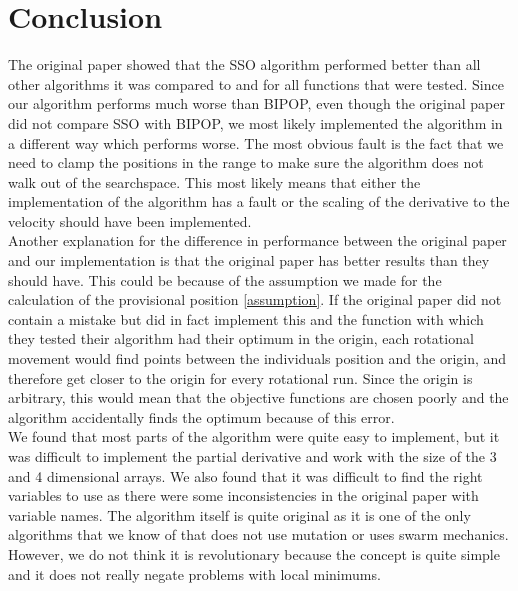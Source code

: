 \documentclass[runningheads]{llncs}
\begin{document}
\section{Conclusion}
The original paper showed that the SSO algorithm performed better than all other algorithms it was compared to and for all functions that were tested. Since our algorithm performs much worse than BIPOP, even though the original paper did not compare SSO with BIPOP, we most likely implemented the algorithm in a different way which performs worse. The most obvious fault is the fact that we need to clamp the positions in the range to make sure the algorithm does not walk out of the searchspace. This most likely means that either the implementation of the algorithm has a fault or the scaling of the derivative to the velocity should have been implemented.\\
Another explanation for the difference in performance between the original paper and our implementation is that the original paper has better results than they should have. This could be because of the assumption we made for the calculation of the provisional position \ref{assumption}. If the original paper did not contain a mistake but did in fact implement this and the function with which they tested their algorithm had their optimum in the origin, each rotational movement would find points between the individuals position and the origin, and therefore get closer to the origin for every rotational run. Since the origin is arbitrary, this would mean that the objective functions are chosen poorly and the algorithm accidentally finds the optimum because of this error.\\
We found that most parts of the algorithm were quite easy to implement, but it was difficult to implement the partial derivative and work with the size of the 3 and 4 dimensional arrays. We also found that it was difficult to find the right variables to use as there were some inconsistencies in the original paper with variable names. The algorithm itself is quite original as it is one of the only algorithms that we know of that does not use mutation or uses swarm mechanics. However, we do not think it is revolutionary because the concept is quite simple and it does not really negate problems with local minimums. 



\end{document}
